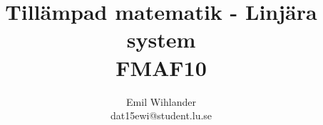 \documentclass[a4paper]{article}
\title{Tillämpad matematik - Linjära system\\ FMAF10}
\author{Emil Wihlander\\ dat15ewi@student.lu.se}
\DeclareMathOperator{\*}{\cdot}
\begin{document}
 
\maketitle
\pagebreak

\pagebreak

\pagebreak

\pagebreak

\pagebreak

\pagebreak

\pagebreak

\pagebreak

\pagebreak

\pagebreak

\pagebreak

\end{document}
